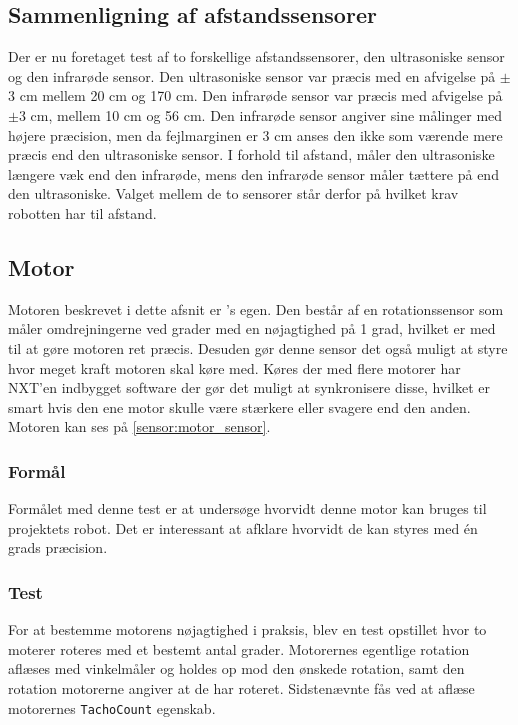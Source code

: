 \subsection{Sammenligning af afstandssensorer}

Der er nu foretaget test af to forskellige afstandssensorer, den ultrasoniske sensor og den infrarøde sensor. 
Den ultrasoniske sensor var præcis med en afvigelse på $\pm$3 cm mellem 20 cm og 170 cm.
Den infrarøde sensor var præcis med afvigelse på $\pm$3 cm, mellem 10 cm og 56 cm.
Den infrarøde sensor angiver sine målinger med højere præcision, men da fejlmarginen er 3 cm anses den ikke som værende mere præcis end den ultrasoniske sensor.
I forhold til afstand, måler den ultrasoniske længere væk end den infrarøde, mens den infrarøde sensor måler tættere på end den ultrasoniske.
Valget mellem de to sensorer står derfor på hvilket krav robotten har til afstand.

\subsection{Motor}\label{sensorer:motorer}
Motoren beskrevet i dette afsnit er \lego's egen.
Den består af en rotationssensor som måler omdrejningerne ved grader med en nøjagtighed på 1 grad, hvilket er med til at gøre motoren ret præcis. 
Desuden gør denne sensor det også muligt at styre hvor meget kraft motoren skal køre med.
Køres der med flere motorer har NXT'en indbygget software der gør det muligt at synkronisere disse, hvilket er smart hvis den ene motor skulle være stærkere eller svagere end den anden.\cite{tikNXT}
Motoren kan ses på \cref{sensor:motor_sensor}.

\subsubsection{Formål}
Formålet med denne test er at undersøge hvorvidt denne motor kan bruges til projektets robot.
Det er interessant at afklare hvorvidt de kan styres med \'en grads præcision.

\subsubsection{Test}
For at bestemme motorens nøjagtighed i praksis, blev en test opstillet hvor to moterer roteres med et bestemt antal grader.
Motorernes egentlige rotation aflæses med vinkelmåler og holdes op mod den ønskede rotation, samt den rotation motorerne angiver at de har roteret.
Sidstenævnte fås ved at aflæse motorernes \lstinline[style=csharp]!TachoCount! egenskab.

